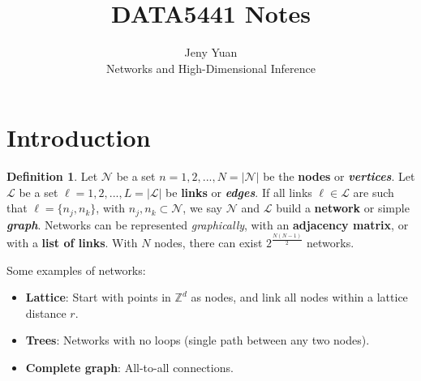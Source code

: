 \documentclass[12pt]{article}
\theoremstyle{definition}
\newtheorem{definition}{Definition}[section]
\begin{document}
\title{DATA5441 Notes}
\author{Jeny Yuan\\
Networks and High-Dimensional Inference}

\maketitle

\section{Introduction}

\begin{definition}
    Let $\mathcal N$ be a set $n=1,2,...,N=|\mathcal N|$ be the \textbf{nodes} or \textit{\textbf{vertices}}. Let $\mathcal L$ be a set $\ell=1,2,...,L=|\mathcal L|$ be \textbf{links} or \textit{\textbf{edges}}. If all links $\ell\in\mathcal L$ are such that $\ell=\{n_j,n_k\}$, with $n_j, n_k\subset \mathcal N$, we say $\mathcal N$ and $\mathcal L$ build a \textbf{network} or simple \textit{\textbf{graph}}. Networks can be represented \textit{graphically}, with an \textbf{adjacency matrix}, or with a \textbf{list of links}. With $N$ nodes, there can exist $2^{\frac{N(N-1)}{2}}$ networks. 
\end{definition}

Some examples of networks: 
\begin{itemize}
    \item \textbf{Lattice}: Start with points in $\mathbb Z^d$ as nodes, and link all nodes within a lattice distance $r$. 
    \item \textbf{Trees}: Networks with no loops (single path between any two nodes). 
    \item \textbf{Complete graph}: All-to-all connections. 
\end{itemize}
\end{document}
